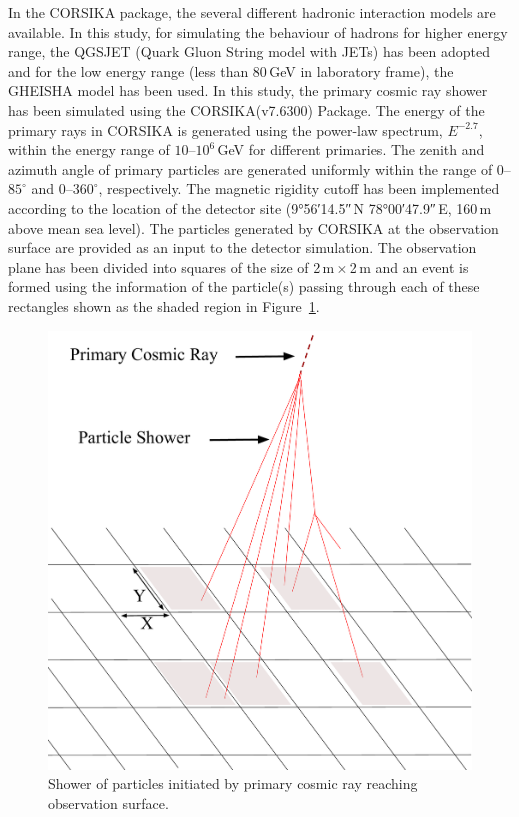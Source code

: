 \documentclass[a4paper,12pt,twoside,openany]{article}
\begin{document}
In the CORSIKA package, the several different hadronic interaction models are available. In this study, for simulating the behaviour of hadrons for higher energy range, the QGSJET (Quark Gluon String model with JETs)\cite{corsika763} has been adopted and for the low energy range (less than 80\,GeV in laboratory frame), the GHEISHA model has been used. In this study, the primary cosmic ray shower has been simulated using the CORSIKA(v7.6300) Package. The energy of the primary rays in CORSIKA is generated using the power-law spectrum, $E^{-2.7}$, within the energy range of \mbox{$10$--$10^{6}$\,GeV} for different primaries. The zenith and azimuth angle of primary particles are generated uniformly within the range of \mbox{$0$--$85^\circ$} and \mbox{$0$--$360^\circ$}, respectively. The magnetic rigidity cutoff has been implemented according to the location of the detector site (\ang{9;56;14.5}\,N \ang{78;00;47.9}\,E, 160\,m above mean sea level). The particles generated by CORSIKA at the observation surface are provided as an input to the detector simulation. The observation plane has been divided into squares of the size of 2\,m\,$\times$\,2\,m and an event is formed using the information of the particle(s) passing through each of these rectangles shown as the shaded region in Figure~\ref{fig:eas}.
\begin{figure}
  \centering
  \includegraphics[width=0.99\linewidth]{EAS.pdf} 
  \caption{Shower of particles initiated by primary cosmic ray reaching observation surface.}
  \label{fig:eas}
\end{figure}
\end{document}
